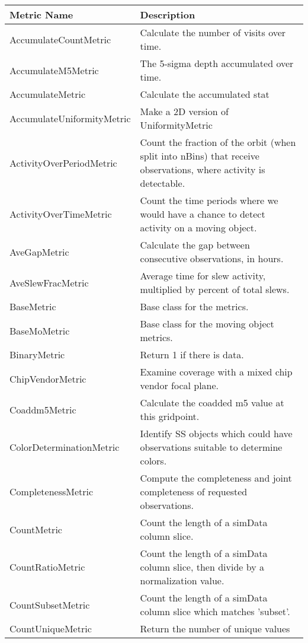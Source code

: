 \begin{table} 
\begin{tabular}{ll}
\hline
                   Metric Name &                                                                                                       Description \\
\hline
 AccumulateCountMetric &  Calculate the number of visits over time. \\
 AccumulateM5Metric &  The 5-sigma depth accumulated over time. \\
 AccumulateMetric &  Calculate the accumulated stat \\
 AccumulateUniformityMetric &  Make a 2D version of UniformityMetric \\
 ActivityOverPeriodMetric &  Count the fraction of the orbit (when split into nBins) that receive observations, where activity is detectable. \\
 ActivityOverTimeMetric &  Count the time periods where we would have a chance to detect activity on a moving object. \\
 AveGapMetric &  Calculate the gap between consecutive observations, in hours. \\
 AveSlewFracMetric &  Average time for slew activity, multiplied by percent of total slews. \\
 BaseMetric &  Base class for the metrics. \\
 BaseMoMetric &  Base class for the moving object metrics. \\
 BinaryMetric &  Return 1 if there is data. \\
 ChipVendorMetric &  Examine coverage with a mixed chip vendor focal plane. \\
 Coaddm5Metric &  Calculate the coadded m5 value at this gridpoint. \\
 ColorDeterminationMetric &  Identify SS objects which could have observations suitable to determine colors. \\
 CompletenessMetric &  Compute the completeness and joint completeness of requested observations. \\
 CountMetric &  Count the length of a simData column slice. \\
 CountRatioMetric &  Count the length of a simData column slice, then divide by a normalization value. \\
 CountSubsetMetric &  Count the length of a simData column slice which matches 'subset'. \\
 CountUniqueMetric &  Return the number of unique values \\

\end{tabular}
\end{table}
